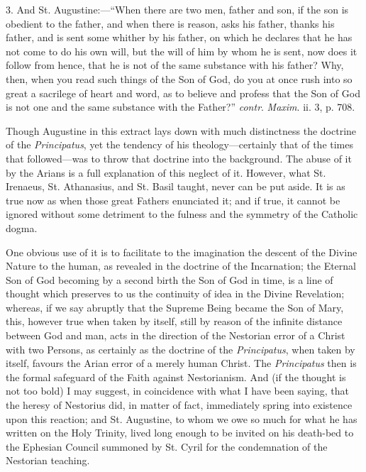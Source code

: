 3. And St. Augustine:—``When there are two men, father and
son, if the son is obedient to the father, and when there is reason,
asks his father, thanks his father, and is sent some whither by his
father, on which he declares that he has not come to do his own will,
but the will of him by whom he is sent, now does it follow from hence,
that he is not of the same substance with his father? Why, then, when
you read such things of the Son of God, do you at once rush into so
great a sacrilege of heart and word, as to believe and profess that
the Son of God is not one and the same substance with the
Father?'' \emph{contr}. \emph{Maxim}. ii. 3, p. 708.

Though Augustine in this extract lays down with much distinctness
the doctrine of the \emph{Principatus}, yet the tendency of his
theology—certainly that of the times that followed—was to throw
that doctrine into the background. The abuse of it by the Arians is a
full explanation of this neglect of it. However, what St. Irenaeus,
St. Athanasius, and St. Basil taught, never can be put aside. It is as
true now as when those great Fathers enunciated it; and if true, it
cannot be ignored without some detriment to the fulness and the
symmetry of the Catholic dogma.

One obvious use of it is to facilitate to the imagination the
descent of the Divine Nature to the human, as revealed in the doctrine
of the Incarnation; the Eternal Son of God becoming by a second birth
the Son of God in time, is a line of thought which preserves to us the
continuity of idea in the Divine Revelation; whereas, if we say
abruptly that the Supreme Being became the Son of Mary, this, however
true when taken by itself, still by reason of the infinite distance
between God and man, acts in the direction of the Nestorian error of a
Christ with two Persons, as certainly as the doctrine of the \emph{Principatus},
when taken by itself, favours the Arian error of a merely human
Christ. The \emph{Principatus} then is the formal safeguard of the
Faith against Nestorianism. And (if the thought is not too bold) I may
suggest, in coincidence with what I have been saying, that the heresy
of Nestorius did, in matter of fact, immediately spring into existence
upon this reaction; and St. Augustine, to whom we owe so much for what
he has written on the Holy Trinity, lived long enough to be invited on
his death-bed to the Ephesian Council summoned by St. Cyril for the
condemnation of the Nestorian teaching.


